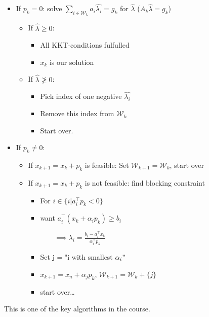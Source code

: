 \documentclass{article}
\begin{document}
\begin{itemize}
  \item If $p_k = 0$: solve $\sum_{i\in \mathcal{W}_k}a_i \hat{\lambda_i} = g_k$ for $\hat{\lambda}$ ($A_k \hat{\lambda} = g_k$)
        \begin{itemize}
          \item If $\hat{\lambda} \geq 0$:
                \begin{itemize}
                  \item All KKT-conditions fulfulled
                  \item $x_k$ is our solution
                \end{itemize}
          \item If $\hat{\lambda} \ngeq 0$:
                \begin{itemize}
                  \item Pick index of one negative $\hat{\lambda_i}$
                  \item Remove this index from $\mathcal{W}_k$
                  \item Start over.
                \end{itemize}
        \end{itemize}
  \item If $p_k \neq 0$: 
  \begin{itemize}
    \item If $x_{k+1} = x_k + p_k$ is feasible: Set $\mathcal{W}_{k+1} = \mathcal{W}_k$, start over
    \item If $x_{k+1} = x_k + p_k$ is not feasible: find blocking constraint 
    \begin{itemize}
      \item For $i\in \{i | a_i^{\top}p_k < 0\}$ 
      \item want $a_i^{\top}(x_k+\alpha_ip_k) \geq b_i$ 
      
      $\qquad \implies \lambda_i = \frac{b_i - a_i^{\top}x_k}{\alpha_i^{\top}p_k}$
      \item Set j = "i with smallest $\alpha_i"$
      \item $x_{k + 1} = x_n + \alpha_j p_k$, $\mathcal{W}_{k+1} = \mathcal{W}_k + \{j\}$
      \item start over\dots
    \end{itemize}
  \end{itemize}
\end{itemize}

This is one of the key algorithms in the course. 
\end{document}
